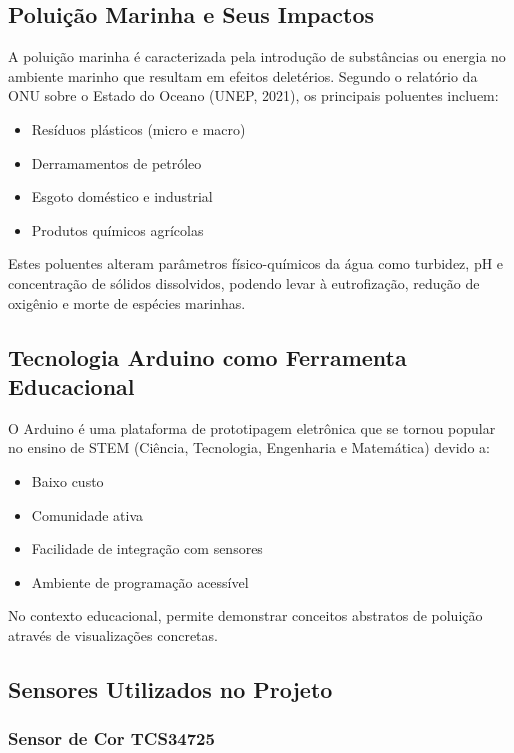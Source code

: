 \documentclass[12pt]{article}
\begin{document}
\subsection{Poluição Marinha e Seus Impactos}

A poluição marinha é caracterizada pela introdução de substâncias ou energia no ambiente marinho que resultam em efeitos deletérios. Segundo o relatório da ONU sobre o Estado do Oceano (UNEP, 2021), os principais poluentes incluem:

\begin{itemize}
    \item Resíduos plásticos (micro e macro)
    \item Derramamentos de petróleo
    \item Esgoto doméstico e industrial
    \item Produtos químicos agrícolas
\end{itemize}

Estes poluentes alteram parâmetros físico-químicos da água como turbidez, pH e concentração de sólidos dissolvidos, podendo levar à eutrofização, redução de oxigênio e morte de espécies marinhas.

\subsection{Tecnologia Arduino como Ferramenta Educacional}

O Arduino é uma plataforma de prototipagem eletrônica que se tornou popular no ensino de STEM (Ciência, Tecnologia, Engenharia e Matemática) devido a:

\begin{itemize}
    \item Baixo custo
    \item Comunidade ativa
    \item Facilidade de integração com sensores
    \item Ambiente de programação acessível
\end{itemize}

No contexto educacional, permite demonstrar conceitos abstratos de poluição através de visualizações concretas.

\subsection{Sensores Utilizados no Projeto}

\subsubsection{Sensor de Cor TCS34725}
\end{document}
